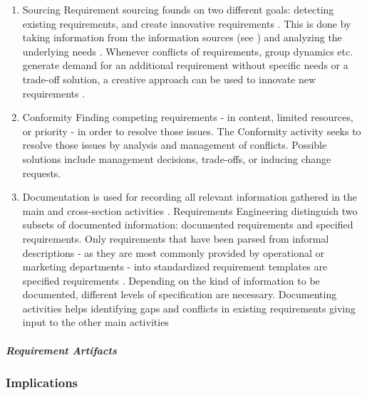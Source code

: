 \begin{enumerate}
    \item{Sourcing}
    Requirement sourcing founds on two different goals: detecting existing requirements, and create innovative requirements \parencite[cf.][318, 321]{Pohl.2007}. This is done by taking information from the information sources (see ) and analyzing the underlying needs \parencite[cf.][75-76]{Sommerville.2000}. Whenever conflicts of requirements, group dynamics etc. generate demand for an additional requirement without specific needs or a trade-off solution, a creative approach can be used to innovate new requirements \parencite[cf.][94]{Lauesen.2008}. 
    \item{Conformity}
    Finding competing requirements - in content, limited resources, or priority - in order to resolve those issues. The Conformity activity seeks to resolve those issues by analysis and management of conflicts. Possible solutions include management decisions, trade-offs, or inducing change requests. \parencite[cf.][393]{Pohl.2007}
    \item{Documentation} is used for recording all relevant information gathered in the main and cross-section activities \parencite[cf.][217]{Pohl.2007}. Requirements Engineering distinguish two subsets of documented information: documented requirements and specified requirements. Only requirements that have been parsed from informal descriptions - as they are most commonly provided by operational or marketing departments - into standardized requirement templates are specified requirements \parencite[cf.][101]{Ebert.2014}. Depending on the kind of information to be documented, different levels of specification are necessary. Documenting activities helps identifying gaps and conflicts in existing requirements giving input to the other main activities \parencite[212]{Pohl.2007}
\end{enumerate}

\subparagraph{Requirement Artifacts}

\subsubsection{Implications}
